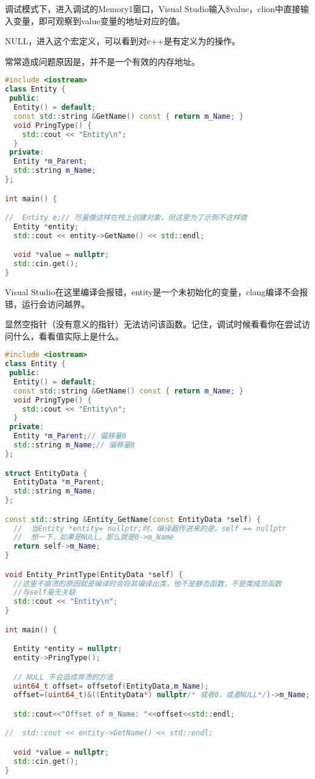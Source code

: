 调试模式下，进入调试的{\ncodestyle Memory1}窗口，Visual Studio输入{\ncodestyle \$value}，clion中直接输入变量，即可观察到{\ncodestyle value}变量的地址对应的值。

{\ncodestyle NULL}，进入这个宏定义，可以看到对c++是有定义为{}的操作。

常常造成问题原因是，{}并不是一个有效的内存地址。

\begin{lstlisting}[language=c++]
#include <iostream>
class Entity {
 public:
  Entity() = default;
  const std::string &GetName() const { return m_Name; }
  void PringType() {
    std::cout << "Entity\n";
  }
 private:
  Entity *m_Parent;
  std::string m_Name;
};

int main() {

//  Entity e;// 尽量像这样在栈上创建对象，但这里为了示例不这样做
  Entity *entity;
  std::cout << entity->GetName() << std::endl;

  void *value = nullptr;
  std::cin.get();
}
\end{lstlisting}

Visual Studio在这里编译会报错，entity是一个未初始化的变量，clang编译不会报错，运行会访问越界。

显然空指针（没有意义的指针）无法访问该函数。记住，调试时候看看你在尝试访问什么，看看值实际上是什么。

\begin{lstlisting}[language=c++]
#include <iostream>
class Entity {
 public:
  Entity() = default;
  const std::string &GetName() const { return m_Name; }
  void PringType() {
    std::cout << "Entity\n";
  }
 private:
  Entity *m_Parent;// 偏移量0
  std::string m_Name;// 偏移量8
};

struct EntityData {
  EntityData *m_Parent;
  std::string m_Name;
};

const std::string &Entity_GetName(const EntityData *self) {
  //  当Entity *entity= nullptr;时，编译器传进来的是，self == nullptr
  //  想一下，如果是NULL，那么就是0->m_Name
  return self->m_Name;
}

void Entity_PrintType(EntityData *self) {
  //这里不崩溃的原因就是编译时会将其编译出类，他不是静态函数，不是类成员函数
  //与self毫无关联
  std::cout << "Entity\n";
}

int main() {

  Entity *entity = nullptr;
  entity->PringType();

  // NULL 不会造成奔溃的方法
  uint64_t offset= offsetof(EntityData,m_Name);
  offset=(uint64_t)&((EntityData*) nullptr/* 或者0，或者NULL*/)->m_Name;// 从nullptr或者0，或者NULL开始，往后访问m_Name位数的数据

  std::cout<<"Offset of m_Name: "<<offset<<std::endl;

//  std::cout << entity->GetName() << std::endl;

  void *value = nullptr;
  std::cin.get();
}
\end{lstlisting}

